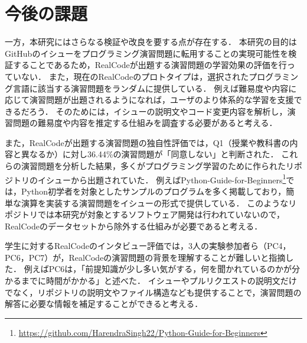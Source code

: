 

\section{今後の課題}
一方，本研究にはさらなる検証や改良を要する点が存在する．
本研究の目的はGitHubのイシューをプログラミング演習問題に転用することの実現可能性を検証することであるため，RealCodeが出題する演習問題の学習効果の評価を行っていない．
また，現在のRealCodeのプロトタイプは，選択されたプログラミング言語に該当する演習問題をランダムに提供している．
例えば難易度や内容に応じて演習問題が出題されるようになれば，ユーザのより体系的な学習を支援できるだろう．
そのためには，イシューの説明文やコード変更内容を解析し，演習問題の難易度や内容を推定する仕組みを調査する必要があると考える．

また，RealCodeが出題する演習問題の独自性評価では，Q1（授業や教科書の内容と異なるか）に対し36.44\%の演習問題が「同意しない」と判断された．
これらの演習問題を分析した結果，多くがプログラミング学習のために作られたリポジトリのイシューから出題されていた．
例えばPython-Guide-for-Beginners\footnote{\url{https://github.com/HarendraSingh22/Python-Guide-for-Beginners}}では，Python初学者を対象としたサンプルのプログラムを多く掲載しており，簡単な演算を実装する演習問題をイシューの形式で提供している．
このようなリポジトリでは本研究が対象とするソフトウェア開発は行われていないので，RealCodeのデータセットから除外する仕組みが必要であると考える．

学生に対するRealCodeのインタビュー評価では，3人の実験参加者ら（PC4，PC6，PC7）が，RealCodeの演習問題の背景を理解することが難しいと指摘した．
例えばPC6は，「前提知識が少し多い気がする，何を聞かれているのかが分かるまでに時間がかかる」と述べた．
イシューやプルリクエストの説明文だけでなく，リポジトリの説明文やファイル構造なども提供することで，演習問題の解答に必要な情報を補足することができると考える．



